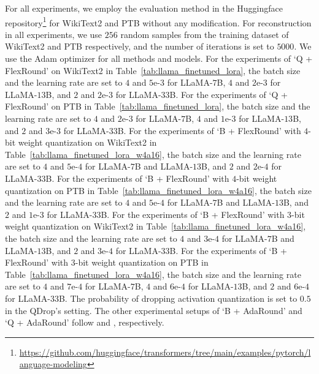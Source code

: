 \documentclass{article}
\theoremstyle{plain}
\theoremstyle{definition}
\theoremstyle{remark}
\begin{document}
For all experiments, we employ the evaluation method in the Huggingface repository\footnote{\url{https://github.com/huggingface/transformers/tree/main/examples/pytorch/language-modeling}} for WikiText2 and PTB without any modification. For reconstruction in all experiments, we use $256$ random samples from the training dataset of WikiText2 and PTB respectively, and the number of iterations is set to $5000$. We use the Adam optimizer for all methods and models. For the experiments of `Q + FlexRound' on WikiText2 in Table~\ref{tab:llama_finetuned_lora}, the batch size and the learning rate are set to $4$ and $5$e-$3$ for LLaMA-$7$B, $4$ and $2$e-$3$ for LLaMA-$13$B, and $2$ and $2$e-$3$ for LLaMA-$33$B. For the experiments of `Q + FlexRound' on PTB in Table~\ref{tab:llama_finetuned_lora}, the batch size and the learning rate are set to $4$ and $2$e-$3$ for LLaMA-$7$B, $4$ and $1$e-$3$ for LLaMA-$13$B, and $2$ and $3$e-$3$ for LLaMA-$33$B. 
For the experiments of `B + FlexRound' with $4$-bit weight quantization on WikiText2 in Table~\ref{tab:llama_finetuned_lora_w4a16}, the batch size and the learning rate are set to $4$ and $5$e-$4$ for LLaMA-$7$B and LLaMA-$13$B, and $2$ and $2$e-$4$ for LLaMA-$33$B. For the experiments of `B + FlexRound' with $4$-bit weight quantization on PTB in Table~\ref{tab:llama_finetuned_lora_w4a16}, the batch size and the learning rate are set to $4$ and $5$e-$4$ for LLaMA-$7$B and LLaMA-$13$B, and $2$ and $1$e-$3$ for LLaMA-$33$B. 
For the experiments of `B + FlexRound' with $3$-bit weight quantization on WikiText2 in Table~\ref{tab:llama_finetuned_lora_w4a16}, the batch size and the learning rate are set to $4$ and $3$e-$4$ for LLaMA-$7$B and LLaMA-$13$B, and $2$ and $3$e-$4$ for LLaMA-$33$B. For the experiments of `B + FlexRound' with $3$-bit weight quantization on PTB in Table~\ref{tab:llama_finetuned_lora_w4a16}, the batch size and the learning rate are set to $4$ and $7$e-$4$ for LLaMA-$7$B, $4$ and $6$e-$4$ for LLaMA-$13$B, and $2$ and $6$e-$4$ for LLaMA-$33$B.
The probability of dropping activation quantization is set to $0.5$ in the QDrop's setting. The other experimental setups of `B + AdaRound' and `Q + AdaRound' follow \citet{li2021brecq} and \citet{wei2022qdrop}, respectively.
\end{document}
